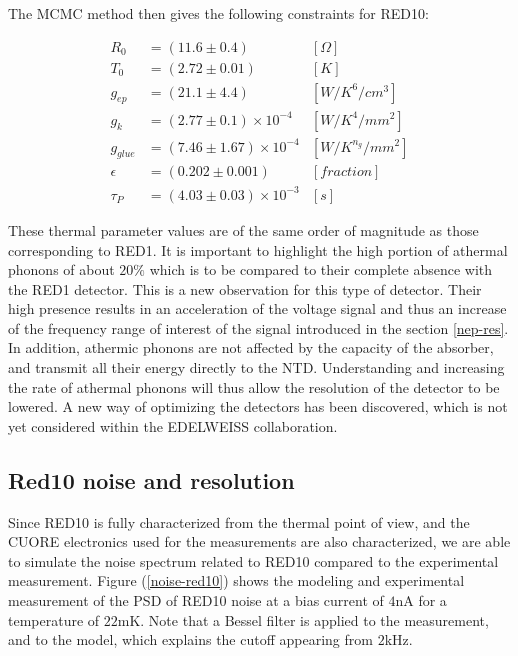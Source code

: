 The MCMC method then gives the following constraints for RED10:

\begin{align}
R_0 &= (11.6 \pm 0.4)&[\Omega] \\
T_0 &= (2.72 \pm 0.01) &[K] \\
g_{ep} &= (21.1 \pm 4.4) &[W/K^6/cm^3] \\
g_k &= (2.77 \pm 0.1) \times 10^{-4}&[W/K^4/mm^2] \\
g_{glue} &= (7.46 \pm 1.67) \times 10^{-4} &[W/K^{n_g}/mm^2] \\
\epsilon &= (0.202 \pm 0.001)  & [fraction]\\
\tau_P &= (4.03 \pm 0.03) \times 10^{-3} &[s]
\end{align}


These thermal parameter values are of the same order of magnitude as those corresponding to RED1. It is important to highlight the high portion of athermal phonons of about $20\%$ which is to be compared to their complete absence with the RED1 detector. This is a new observation for this type of detector. Their high presence results in an acceleration of the voltage signal and thus an increase of the frequency range of interest of the signal introduced in the section \ref{nep-res}. In addition, athermic phonons are not affected by the capacity of the absorber, and transmit all their energy directly to the NTD. Understanding and increasing the rate of athermal phonons will thus allow the resolution of the detector to be lowered. A new way of optimizing the detectors has been discovered, which is not yet considered within the EDELWEISS collaboration.

\subsection{Red10 noise and resolution}

Since RED10 is fully characterized from the thermal point of view, and the CUORE electronics used for the measurements are also characterized, we are able to simulate the noise spectrum related to RED10 compared to the experimental measurement. Figure (\ref{noise-red10}) shows the modeling and experimental measurement of the PSD of RED10 noise at a bias current of $4$nA for a temperature of $22$mK. Note that a Bessel filter is applied to the measurement, and to the model, which explains the cutoff appearing from $2$kHz.

